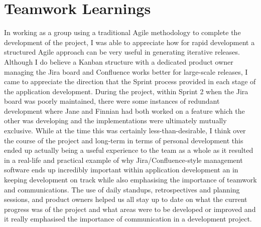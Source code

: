 \documentclass{scrreprt}
\begin{document}
\section{Teamwork Learnings}\label{LrnTeam}
In working as a group using a traditional Agile methodology to complete the development of the project, I was able to appreciate how for rapid development a structured Agile approach can be very useful in generating iterative releases. Although I do believe a Kanban structure with a dedicated product owner managing the Jira board and Confluence works better for large-scale releases, I came to appreciate the direction that the Sprint process provided in each stage of the application development. During the project, within Sprint 2 when the Jira board was poorly maintained, there were some instances of redundant development where Jane and Finnian had both worked on a feature which the other was developing and the implementations were ultimately mutually exclusive. While at the time this was certainly less-than-desirable, I think over the course of the project and long-term in terms of personal development this ended up actually being a useful experience to the team as a whole as it resulted in a real-life and practical example of why Jira/Confluence-style management software ends up incredibly important within application development an in keeping development on track while also emphasising the importance of teamwork and communications. The use of daily standups, retrospectives and planning sessions, and product owners helped us all stay up to date on what the current progress was of the project and what areas were to be developed or improved and it really emphasised the importance of communication in a development project.\\
\\
\end{document}
